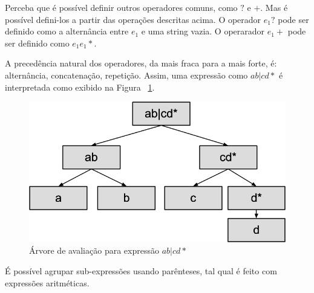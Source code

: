 \documentclass[a4paper,12pt,oneside,onecolumn]{uerj}
\begin{document}
Perceba que é possível definir outros operadores comuns, como $?$ e $+$. Mas é possível defini-los a partir das operações descritas acima. O operador $e_1?$ pode ser definido como a alternância entre $e_1$ e uma string vazia. O operarador $e_1+$ pode ser definido como $e_1e_1*$.

A precedência natural dos operadores, da mais fraca para a mais forte, é: alternância, concatenação, repetição. Assim, uma expressão como $ab|cd*$ é interpretada como exibido na Figura ~\ref{fig:abcd_parse_tree}.

\begin{figure}[ht]
  \centering
  \includegraphics[scale=0.33]{figures/abcd_parse_tree.png}
  \caption{Árvore de avaliação para expressão $ab|cd*$}
  \label{fig:abcd_parse_tree}
\end{figure}

É possível agrupar sub-expressões usando parênteses, tal qual é feito com expressões aritméticas. 

\backmatter

\end{document}
